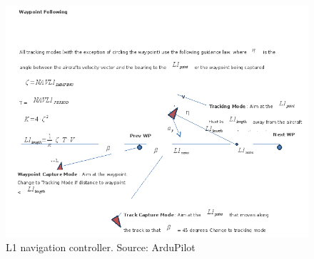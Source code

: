 \begin{figure}[H]
\centering
  \includegraphics[width=0.9\linewidth]{figs/l1.png}	
  \caption{L1 navigation controller. Source: ArduPilot}
  \label{fig:l1_loop}
\end{figure}

